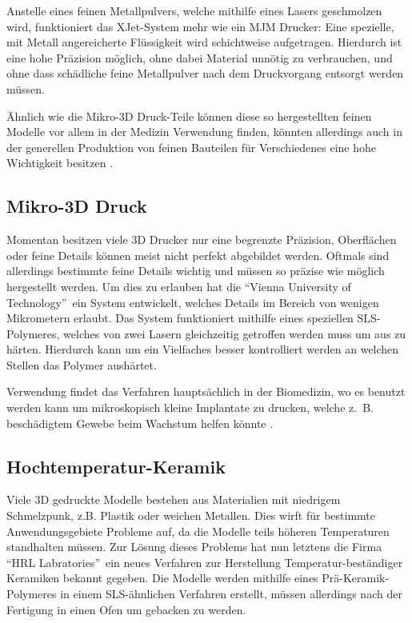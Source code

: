 Anstelle eines feinen Metallpulvers, welche mithilfe eines Lasers geschmolzen wird, funktioniert das XJet-System mehr wie ein MJM Drucker: Eine spezielle, mit Metall angereicherte Flüssigkeit wird schichtweise aufgetragen. Hierdurch ist eine hohe Präzision möglich, ohne dabei Material unnötig zu verbrauchen, und ohne dass schädliche feine Metallpulver nach dem Druckvorgang entsorgt werden müssen.

Ähnlich wie die Mikro-3D Druck-Teile können diese so hergestellten feinen Modelle vor allem in der Medizin Verwendung finden, könnten allerdings auch in der generellen Produktion von feinen Bauteilen für Verschiedenes eine hohe Wichtigkeit besitzen \parencite{XJET}.

\subsection{Mikro-3D Druck}
Momentan besitzen viele 3D Drucker nur eine begrenzte Präzision, Oberflächen oder feine Details können meist nicht perfekt abgebildet werden. Oftmals sind allerdings bestimmte feine Details wichtig und müssen so präzise wie möglich hergestellt werden. Um dies zu erlauben hat die \textquotedblleft Vienna University of Technology\textquotedblright ~ein System entwickelt, welches Details im Bereich von wenigen Mikrometern erlaubt.
Das System funktioniert mithilfe eines speziellen SLS-Polymeres, welches von zwei Lasern gleichzeitig getroffen werden muss um aus zu härten. Hierdurch kann um ein Vielfaches besser kontrolliert werden an welchen Stellen das Polymer aushärtet.

Verwendung findet das Verfahren hauptsächlich in der Biomedizin, wo es benutzt werden kann um mikroskopisch kleine Implantate zu drucken, welche z.~B. beschädigtem Gewebe beim Wachstum helfen könnte \parencite{MICROPRINT}.

\subsection{Hochtemperatur-Keramik}
Viele 3D gedruckte Modelle bestehen aus Materialien mit niedrigem Schmelzpunk, z.B. Plastik oder weichen Metallen. Dies wirft für bestimmte Anwendungsgebiete Probleme auf, da die Modelle teils höheren Temperaturen standhalten müssen. Zur Lösung dieses Problems hat nun letztens die Firma \textquotedblleft HRL Labratories\textquotedblright ~ein neues Verfahren zur Herstellung Temperatur-beständiger Keramiken bekannt gegeben. Die Modelle werden mithilfe eines Prä-Keramik-Polymeres in einem SLS-ähnlichen Verfahren erstellt, müssen allerdings nach der Fertigung in einen Ofen um gebacken zu werden.

